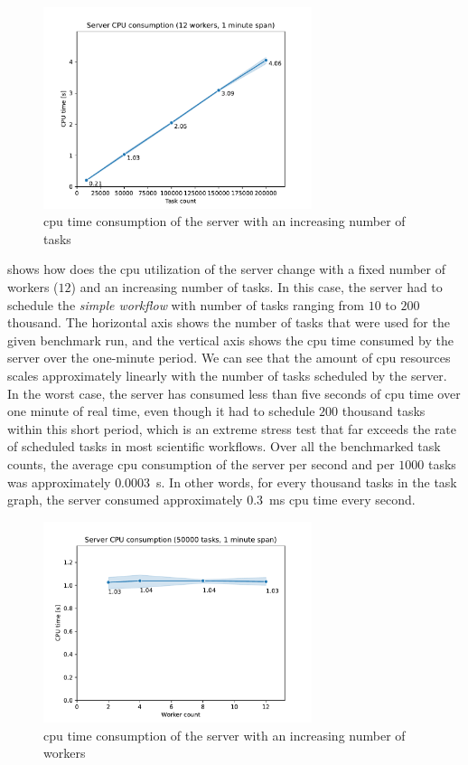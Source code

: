 \begin{figure}[h]
	\centering
	\includegraphics[width=0.7\textwidth]{imgs/hq/charts/server-utilization-tasks}
	\caption{\gls{cpu} time consumption of the \hyperqueue{} server with an increasing
	number of tasks}
	\label{fig:hq-server-cpu-consumption-tasks}
\end{figure}

 shows how does the \gls{cpu} utilization of the
server change with a fixed number of workers ($12$) and an increasing number of
tasks. In this case, the server had to schedule the \emph{simple workflow} with number of tasks ranging from
$10$ to $200$ thousand. The horizontal axis shows the number
of tasks that were used for the given benchmark run, and the vertical axis shows the
\gls{cpu} time consumed by the server over the one-minute period. We can see that the
amount of \gls{cpu} resources scales approximately linearly with the number of tasks
scheduled by the server. In the worst case, the server has consumed less than five seconds of
\gls{cpu} time over one minute of real time, even though it had to schedule
$200$ thousand tasks within this short period, which is an extreme stress test
that far exceeds the rate of scheduled tasks in most scientific workflows. Over all the benchmarked
task counts, the average \gls{cpu} consumption of the server per second and per
$1000$ tasks was approximately $0.0003$~s. In other words, for
every thousand tasks in the task graph, the server consumed approximately
$0.3$~ms \gls{cpu} time every second.

\begin{figure}[h]
	\centering
	\includegraphics[width=0.7\textwidth]{imgs/hq/charts/server-utilization-workers}
	\caption{\gls{cpu} time consumption of the \hyperqueue{} server with an increasing
	number of workers}
	\label{fig:hq-server-cpu-consumption-workers}
\end{figure}

